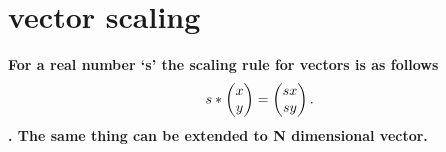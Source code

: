 \documentclass[../main.tex]{subfiles}
\begin{document}
\section{vector scaling}

\begin{definition}
  \label{def:vector_scaling}

  \textbf{For a real number `s' the scaling rule for vectors is as follows \[
s * \blockcomment{Column-Vector: x, y} \begin{pmatrix} x \\  y \end{pmatrix} = \blockcomment{Column-Vector: sx, sy} \begin{pmatrix} sx \\  sy \end{pmatrix}
.\]. The same thing can be extended to N dimensional vector.}


\end{definition}

\pagebreak
\end{document}
